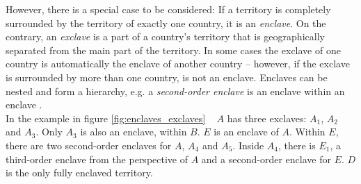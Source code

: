 \vspace{-0.5em}
\begin{minipage}[t]{0.60\textwidth}

However, there is a special case to be considered:
If a territory is completely surrounded by the territory of exactly one country, it is an \emph{enclave}. On the contrary, an \emph{exclave} is a part of a country's territory that is geographically separated from the main part of the territory. In some cases the exclave of one country is automatically the enclave of another country -- however, if the exclave is surrounded by more than one country, is not an enclave. Enclaves can be nested and form a hierarchy, e.g. a \emph{second-order enclave} is an enclave within an enclave
\cite{enclavesexclaves}. \\[-0.6em]

In the example in figure \ref{fig:enclaves_exclaves} ~ $A$ has three exclaves: $A_1$, $A_2$ and $A_3$. Only $A_3$ is also an enclave, within $B$. $E$ is an enclave of $A$. Within $E$, there are two second-order enclaves for $A$, $A_4$ and $A_5$. Inside $A_4$, there is $E_1$, a third-order enclave from the perspective of $A$ and a second-order enclave for $E$. $D$ is the only fully enclaved territory.

\end{minipage}             %
\hspace{0.05\textwidth}    %
